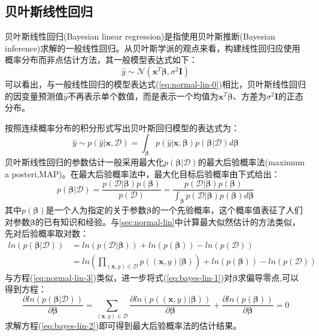 \documentclass[a4paper]{ctexart}
\begin{document}
\begin{spacing}{1.3}
	\subsection{贝叶斯线性回归}
	贝叶斯线性回归(Bayesian linear regression)\cite{RN73}\cite{RN74}是指使用贝叶斯推断(Bayesian inference)求解的一般线性回归。从贝叶斯学派的观点来看，构建线性回归应使用概率分布而非点估计方法，其一般模型表达式如下：
	\begin{equation}
	\hat{y}\sim\mathcal{N}(\bm x^T\bm\beta,\sigma^2\bm I)
	\end{equation}
	可以看出，与一般线性回归的模型表达式(\ref{eq:normal-lin-0})相比，贝叶斯线性回归的因变量预测值$\hat{y}$不再表示单个数值，而是表示一个均值为$\bm x^T\bm\beta$、方差为$\sigma^2\bm I$的正态分布。
	
	按照连续概率分布的积分形式写出贝叶斯回归模型的表达式为：
	\begin{equation}
	\hat{y}\sim p(\hat{y}|\bm x,\mathcal{D})=\int_{\bm\beta}p(\hat{y}|\bm x,\bm\beta)p(\bm\beta|\mathcal{D})d\bm\beta
	\end{equation}
	贝叶斯线性回归的参数估计一般采用最大化$p(\bm\beta|\mathcal{D})$的最大后验概率法(maximum a posteri,MAP)。在最大后验概率法中，最大化目标后验概率由下式给出：
	\begin{equation}\label{eq:bayes-lin-0}
	p(\bm\beta|\mathcal{D})=\frac{p(\mathcal{D}|\bm\beta)p(\bm\beta)}{p(\mathcal{D})}=\frac{p(\mathcal{D}|\bm\beta)p(\bm\beta)}{\int_{\bm\beta} p(\mathcal{D}|\bm\beta)p(\bm\beta)d\bm\beta}
	\end{equation}
	其中$p(\bm\beta)$是一个人为指定的关于参数$\bm\beta$的一个先验概率，这个概率值表征了人们对参数$\bm\beta$的已有知识和经验。与\ref{sec:normal-lin}中计算最大似然估计的方法类似，先对后验概率取对数：
	\begin{equation}\label{eq:bayes-lin-1}
	\begin{split}
	ln(p(\bm\beta|\mathcal{D}))&=ln(p(\mathcal{D}|\bm\beta))+ln(p(\bm\beta))-ln(p(\mathcal{D}))\\
	&=ln\left(\prod_{(\bm{x},y)\in \mathcal{D}}p((\bm x,y)|\bm\beta)\right)+ln(p(\bm\beta))-ln(p(\mathcal{D}))
	\end{split}
	\end{equation}
	与方程(\ref{eq:normal-lin-3})类似，进一步将式(\ref{eq:bayes-lin-1})对$\bm\beta$求偏导零点,可以得到方程：
	\begin{equation}\label{eq:bayes-lin-2}
	\frac{\partial ln(p(\bm\beta|\mathcal{D}))}{\partial\bm\beta}=\sum_{(\bm{x},y)\in \mathcal{D}}\frac{\partial ln(p((\bm x,y)|\bm\beta))}{\partial\bm\beta}+	\frac{\partial ln(p(\bm\beta))}{\partial\bm\beta}=0
	\end{equation}
	求解方程(\ref{eq:bayes-lin-2})即可得到最大后验概率法的估计结果。
	

\end{spacing}
\end{document}
